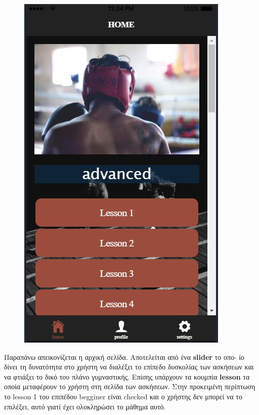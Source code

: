 \documentclass[a4paper,12pt]{article}
\begin{document}
\begin{figure}[!htb]
				\endminipage\hfill
				  \includegraphics[width=\linewidth]{home3}
				  
				\endminipage
			\end{figure}

			\vspace*{1cm}


			Παραπάνω απεικονίζεται η αρχική σελίδα. Αποτελείται από ένα \textbf{slider} το οπο-
			ίο δίνει τη δυνατότητα στο χρήστη να διαλέξει 
			το επίπεδο δυσκολίας των ασκήσεων και να φτιάξει το δικό του πλάνο γυμναστικής. Επίσης υπάρχουν τα κουμπία \textbf{lesson} τα οποία μεταφέρουν το χρήστη στη σελίδα των ασκήσεων. Στην 
			προκειμένη περίπτωση το lesson 1 του επιπέδου begginer είναι checked και ο χρήστης δεν μπορεί να το επιλέξει, αυτό γιατί έχει 
			ολοκληρώσει το μάθημα αυτό. 
\end{document}

